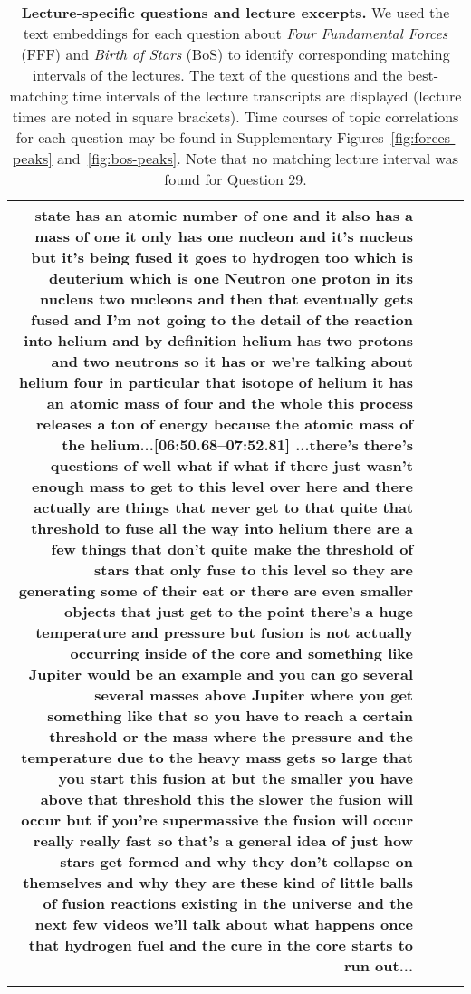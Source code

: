 \documentclass[10pt]{article}
\begin{document}
\begin{tiny}
\begin{longtable}{|r|p{0.375in}|p{1.275in}|p{3.5in}|}
state has an atomic number of one and it also has a mass of one it only has one nucleon and it's nucleus but it's being fused it goes to hydrogen too which is deuterium which is one Neutron one proton in its nucleus two nucleons and then that eventually gets fused and I'm not going to the detail of the reaction into helium and by definition helium has two protons and two neutrons so it has or we're talking about helium four in particular that isotope of helium it has an atomic mass of four and the whole this process releases a ton of energy because the atomic mass of the helium...\newline\textbf{[06:50.68--07:52.81]} ...there's there's questions of well what if what if there just wasn't enough mass to get to this level over here and there actually are things that never get to that quite that threshold to fuse all the way into helium there are a few things that don't quite make the threshold of stars that only fuse to this level so they are generating some of their eat or there are even smaller objects that just get to the point there's a huge temperature and pressure but fusion is not actually occurring inside of the core and something like Jupiter would be an example and you can go several several masses above Jupiter where you get something like that so you have to reach a certain threshold or the mass where the pressure and the temperature due to the heavy mass gets so large that you start this fusion at but the smaller you have above that threshold this the slower the fusion will occur but if you're supermassive the fusion will occur really really fast so that's a general idea of just how stars get formed and why they don't collapse on themselves and why they are these kind of little balls of fusion reactions existing in the universe and the next few videos we'll talk about what happens once that hydrogen fuel and the cure in the core starts to run out... \\\hline

\caption{\textbf{Lecture-specific questions and lecture excerpts.} We used the
text embeddings for each question about \textit{Four Fundamental Forces} (FFF)
and \textit{Birth of Stars} (BoS) to identify corresponding matching intervals of the
lectures. The text of the questions and the best-matching time intervals of the
lecture transcripts are displayed (lecture times are noted in square brackets).
Time courses of topic correlations for each question may be found in
Supplementary Figures~\ref{fig:forces-peaks} and~\ref{fig:bos-peaks}. Note that
no matching lecture interval was found for Question 29.} 
\label{tab:matches}
\end{longtable}
\end{tiny}
\end{document}

